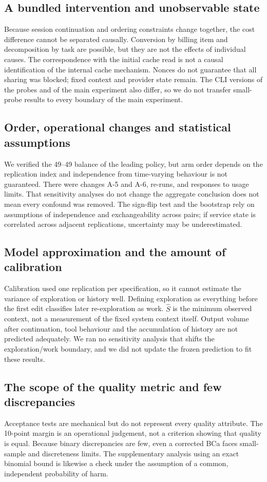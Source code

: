 \documentclass[a4paper,11pt]{article}
\begin{document}
\subsection{A bundled intervention and unobservable state}
Because session continuation and ordering constraints change together, the cost difference cannot be separated causally. Conversion by billing item and decomposition by task are possible, but they are not the effects of individual causes. The correspondence with the initial cache read is not a causal identification of the internal cache mechanism. Nonces do not guarantee that all sharing was blocked; fixed context and provider state remain. The CLI versions of the probes and of the main experiment also differ, so we do not transfer small-probe results to every boundary of the main experiment.

\subsection{Order, operational changes and statistical assumptions}
We verified the 49--49 balance of the leading policy, but arm order depends on the replication index and independence from time-varying behaviour is not guaranteed. There were changes A-5 and A-6, re-runs, and responses to usage limits. That sensitivity analyses do not change the aggregate conclusion does not mean every confound was removed. The sign-flip test and the bootstrap rely on assumptions of independence and exchangeability across pairs; if service state is correlated across adjacent replications, uncertainty may be underestimated.

\subsection{Model approximation and the amount of calibration}
Calibration used one replication per specification, so it cannot estimate the variance of exploration or history well. Defining exploration as everything before the first edit classifies later re-exploration as work. $\widehat S$ is the minimum observed context, not a measurement of the fixed system context itself. Output volume after continuation, tool behaviour and the accumulation of history are not predicted adequately. We ran no sensitivity analysis that shifts the exploration/work boundary, and we did not update the frozen prediction to fit these results.

\subsection{The scope of the quality metric and few discrepancies}
Acceptance tests are mechanical but do not represent every quality attribute. The 10-point margin is an operational judgement, not a criterion showing that quality is equal. Because binary discrepancies are few, even a corrected BCa faces small-sample and discreteness limits. The supplementary analysis using an exact binomial bound is likewise a check under the assumption of a common, independent probability of harm.
\end{document}
